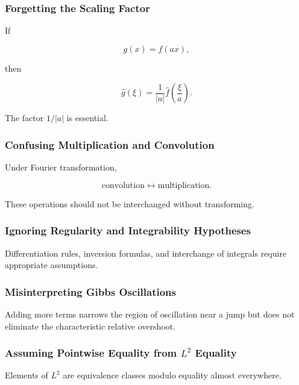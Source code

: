 \subsubsection{Forgetting the Scaling Factor}

If

\[
g(x)=f(ax),
\]

then

\[
\widehat{g}(\xi)
=
\frac1{|a|}
\widehat{f}\left(\frac{\xi}{a}\right).
\]

The factor \(1/|a|\) is essential.

\subsubsection{Confusing Multiplication and Convolution}

Under Fourier transformation,

\[
\boxed{
\text{convolution}
\longleftrightarrow
\text{multiplication}.
}
\]

These operations should not be interchanged without transforming.

\subsubsection{Ignoring Regularity and Integrability Hypotheses}

Differentiation rules, inversion formulas, and interchange of integrals
require appropriate assumptions.

\subsubsection{Misinterpreting Gibbs Oscillations}

Adding more terms narrows the region of oscillation near a jump but does
not eliminate the characteristic relative overshoot.

\subsubsection{Assuming Pointwise Equality from \(L^2\) Equality}

Elements of \(L^2\) are equivalence classes modulo equality almost
everywhere.

